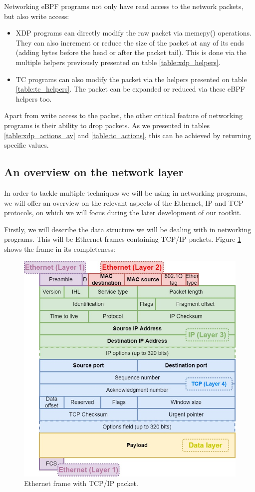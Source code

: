 \documentclass[12pt]{report} %
\begin{document}
Networking eBPF programs not only have read access to the network packets, but also write access:
\begin{itemize}
\item XDP programs can directly modify the raw packet via memcpy() operations. They can also increment or reduce the size of the packet at any of its ends (adding bytes before the head or after the packet tail). This is done via the multiple helpers previously presented on table \ref{table:xdp_helpers}.
\item TC programs can also modify the packet via the helpers presented on table \ref{table:tc_helpers}. The packet can be expanded or reduced via these eBPF helpers too.
\end{itemize} 

Apart from write access to the packet, the other critical feature of networking programs is their ability to drop packets. As we presented in tables \ref{table:xdp_actions_av} and \ref{table:tc_actions}, this can be achieved by returning specific values.

\subsection{An overview on the network layer}
In order to tackle multiple techniques we will be using in networking programs, we will offer an overview on the relevant aspects of the Ethernet, IP and TCP protocols, on which we will focus during the later development of our rootkit.

Firstly, we will describe the data structure we will be dealing with in networking programs. This will be Ethernet frames containing TCP/IP packets. Figure \ref{fig:frame} shows the frame in its completeness:

\begin{figure}[H]
	\centering
	\includegraphics[width=14cm]{frame.jpg}
	\caption{Ethernet frame with TCP/IP packet.}
	\label{fig:frame}
\end{figure}
\end{document}
